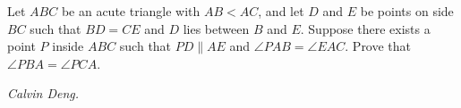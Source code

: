Let $ABC$ be an acute triangle with $AB<AC$, and let $D$ and $E$ be points on side $BC$ such that $BD=CE$ and $D$ lies between $B$ and $E$. Suppose there exists a point $P$ inside $ABC$ such that $PD\parallel AE$ and $\angle PAB=\angle EAC$. Prove that $\angle PBA=\angle PCA$.

\textit{Calvin Deng.}
